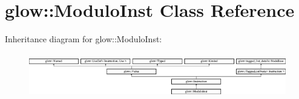 \hypertarget{classglow_1_1_modulo_inst}{}\section{glow\+:\+:Modulo\+Inst Class Reference}
\label{classglow_1_1_modulo_inst}
Inheritance diagram for glow\+:\+:Modulo\+Inst\+:\begin{figure}[H]
\begin{center}
\leavevmode
\includegraphics[height=1.991111cm]{classglow_1_1_modulo_inst}
\end{center}
\end{figure}
